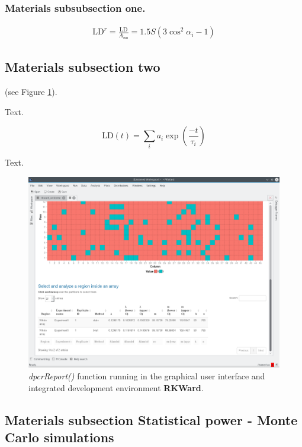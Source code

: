 \documentclass[a4,center,fleqn]{NAR}
\begin{document}
\subsubsection{Materials subsubsection one.}

\begin{align}
\mathrm{LD}^r = \frac{\mathrm{LD}}{A_\mathrm{iso}}
= 1.5 S \left( 3 \cos^2 \alpha_i - 1 \right)
\end{align}



\subsection{Materials subsection two}

(see Figure \ref{GUI_RKWard_1}).

Text.

\begin{equation*}
\mathrm{LD} \left( t \right) =
\sum\limits_i
a_i \exp \left( \frac{-t}{\tau_i} \right)
\end{equation*}

Text.

\begin{figure}[t]
\begin{center}
\includegraphics[width=17cm]{GUI_RKWard_1.png}
\end{center}
\caption{\textit{dpcrReport()} function running in the graphical user interface and integrated development environment \textbf{RKWard}.}
\label{GUI_RKWard_1}
\end{figure}

\subsection{Materials subsection Statistical power - Monte Carlo simulations}
\end{document}
